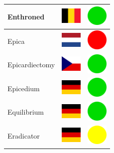 \documentclass[12pt, a4paper, twoside]{report}
\begin{document}
\begin{center}
\begin{longtable}{|p{5cm}|p{2cm}|p{2cm}|}
 Enthroned                                                  & \includegraphics[width=1cm]{../img/flags/be} &   \includegraphics[width=1cm]{../likes/y} \\ \hline
 Epica                                                      & \includegraphics[width=1cm]{../img/flags/nl} &   \includegraphics[width=1cm]{../likes/n} \\ \hline
 Epicardiectomy                                             & \includegraphics[width=1cm]{../img/flags/cz} &   \includegraphics[width=1cm]{../likes/y} \\ \hline
 Epicedium                                                  & \includegraphics[width=1cm]{../img/flags/de} &   \includegraphics[width=1cm]{../likes/y} \\ \hline
 Equilibrium                                                & \includegraphics[width=1cm]{../img/flags/de} &   \includegraphics[width=1cm]{../likes/y} \\ \hline
 Eradicator                                                 & \includegraphics[width=1cm]{../img/flags/de} &   \includegraphics[width=1cm]{../likes/m} \\ \hline

\end{longtable}
\end{center}
\end{document}
